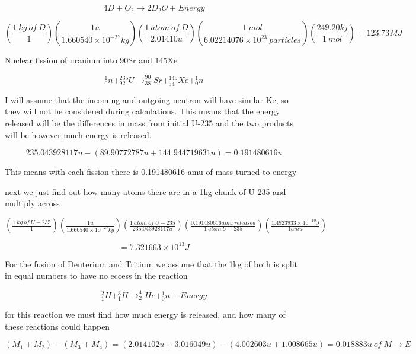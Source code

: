 \documentclass{article}
\begin{document}
$$4D + O_2 \xrightarrow{} 2D_2O + Energy$$

$$\left(\frac{1\ kg \ of \ D}{1}\right)\left(\frac{1u}{1.660540\times10^{-27}kg}\right)\left(\frac{1 \ atom \ of \ D}{2.01410u}\right)\left(\frac{1 \ mol}{6.02214076\times10^{23}\ particles}\right)\left(\frac{249.20kj}{1 \ mol}\right)=123.73MJ$$\vspace{10pt}
\begin{center}
    Nuclear fission of uranium into 90Sr and 145Xe 
\end{center}\vspace{10pt}
$$^1_0n + ^{235}_{92}U \xrightarrow{} ^{90}_{38}Sr + ^{145}_{54}Xe + ^1_0n$$\vspace{10pt}
 

I will assume that the incoming and outgoing neutron will have similar Ke, so they will not be considered during calculations. This means that the energy released will be the differences in mass from initial U-235 and the two products will be however much energy is released. \vspace{10pt}

$$235.043928117u-(89.90772787u+144.944719631u) = 0.191480616u$$

This means with each fission there is 0.191480616 amu of mass turned to energy\vspace{5pt}

next we just find out how many atoms there are in a 1kg chunk of U-235 and multiply across\vspace{10pt}

$\left(\frac{1 \ kg \ of \ U-235}{1}\right)\left(\frac{1u}{1.660540\times10^{-27}kg}\right)\left(\frac{1 \ atom \ of \ U-235}{235.043928117u}\right)\left(\frac{ 0.191480616 amu \ released}{1 \ atom \ U-235}\right)\left(\frac{1.4923933\times10^{-10} J}{1 amu}\right)$\vspace{10pt}

$$=7.321663\times10^{13}J$$\vspace{10pt}

For the fusion of Deuterium and Tritium we assume that the 1kg of both is split in equal numbers to have no eccess in the reaction\vspace{10pt}

$$^2_1H+^3_1H\xrightarrow{} ^4_2He + ^1_0n + Energy$$

for this reaction we must find how much energy is released, and how many of these reactions could happen

$$(M_1+M_2)-(M_3+M_4)= (2.014102u+3.016049u)-(4.002603u+1.008665u)= 0.018883u \ of \ M\xrightarrow{}E$$
\end{document}
